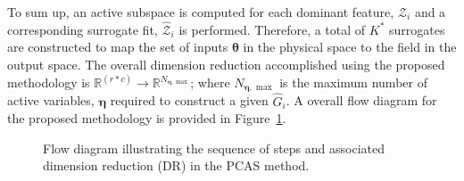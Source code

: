 To sum up, an active subspace is computed for each dominant feature, $\mathcal{Z}_i$ and a corresponding
surrogate fit, $\hat{\mathcal{Z}}_i$ is performed. Therefore, a total of $K^\ast$ surrogates are constructed
to map the set of inputs $\bm{\theta}$ in the physical space to the field in the output space. The overall dimension
reduction accomplished using the proposed methodology is $\mathbb{R}^{(r\ast c)}\rightarrow \mathbb{R}^{N_{\bm{\eta},
\max}}$; where $N_{\bm{\eta},\max}$ is the maximum number of active variables, $\bm{\eta}$ required to construct
a given $\hat{G}_i$. A overall flow diagram for the proposed methodology is provided in Figure~\ref{fig:fd}.
%
\begin{figure}[htbp]
\begin{center}
\end{center}
\caption{Flow diagram illustrating the sequence of steps and associated dimension reduction (DR) in the PCAS method.}
\label{fig:fd}
\end{figure}
